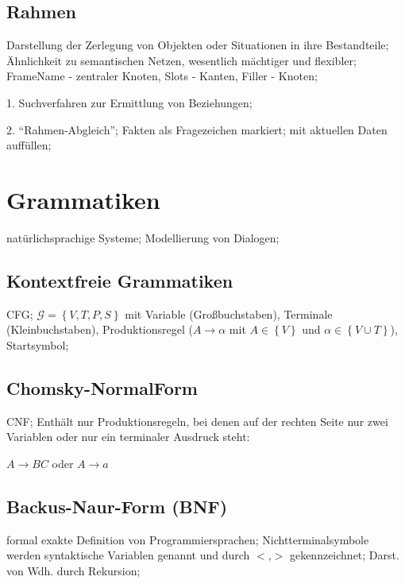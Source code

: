\documentclass[german,color,6pt]{latex4ei/latex4ei_sheet}
\begin{document}
\begin{sectionbox}
\subsection{Rahmen}
Darstellung der Zerlegung von Objekten oder Situationen in ihre Bestandteile; Ähnlichkeit zu semantischen Netzen, wesentlich mächtiger und flexibler; FrameName - zentraler Knoten, Slots - Kanten, Filler - Knoten; 

1. Suchverfahren zur Ermittlung von Beziehungen; 

2. "`Rahmen-Abgleich"'; Fakten als Fragezeichen markiert; mit aktuellen Daten auffüllen; 
\end{sectionbox}


\section{Grammatiken}
\begin{symbolbox}
natürlichsprachige Systeme; Modellierung von Dialogen; 
\end{symbolbox}

\begin{sectionbox}
\subsection{Kontextfreie Grammatiken}
CFG; $ \mathcal G = \left\{ V, T, P, S \right\} $ mit Variable (Großbuchstaben), Terminale (Kleinbuchstaben), Produktionsregel ($A \rightarrow \alpha $ mit $A \in \left\{V \right\}$ und $\alpha \in \left\{ V \cup T \right\} $), Startsymbol; 
\end{sectionbox}

\begin{sectionbox}
\subsection{Chomsky-NormalForm}
CNF; Enthält nur Produktionsregeln, bei denen auf der rechten Seite nur zwei Variablen oder nur ein terminaler Ausdruck steht: 

\begin{emphbox}
	$A \rightarrow BC$ oder $A \rightarrow a$
\end{emphbox}
\end{sectionbox}

\begin{sectionbox}
\subsection{Backus-Naur-Form (BNF)}
formal exakte Definition von Programmiersprachen; Nichtterminalsymbole werden syntaktische Variablen genannt und durch $<$,$ >$ gekennzeichnet; Darst. von Wdh. durch Rekursion; 
\end{sectionbox}
\end{document}

